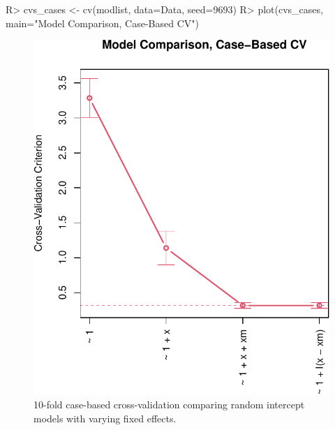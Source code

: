 \documentclass[
]{jss}
\begin{document}
\begin{CodeChunk}
\begin{CodeInput}
R> cvs_cases <- cv(modlist, data=Data, seed=9693)
R> plot(cvs_cases, main="Model Comparison, Case-Based CV")
\end{CodeInput}
\begin{figure}

{\centering \includegraphics[width=1\linewidth]{JSS-article-reduced_files/figure-latex/cross-validation-cases-1} 

}

\caption[10-fold case-based cross-validation comparing random intercept models with varying fixed effects]{10-fold case-based cross-validation comparing random intercept models with varying fixed effects.}\label{fig:cross-validation-cases}
\end{figure}
\end{CodeChunk}
\end{document}
